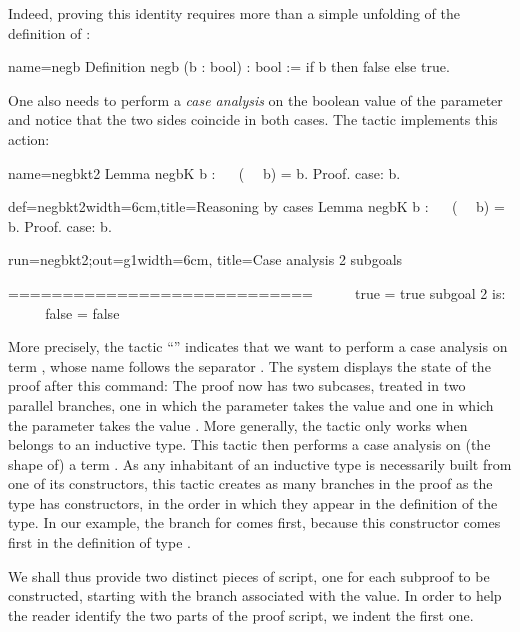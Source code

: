 Indeed, proving this identity requires more than a simple unfolding of
the definition of :

\begin{coq}{name=negb}{}
Definition negb (b : bool) : bool := if b then false else true.
\end{coq}
One also needs to perform a \emph{case analysis} on the boolean value
of the parameter  and notice that the two sides coincide in
both cases. The tactic  implements this action:

\begin{coqdef}{name=negbkt2}
Lemma negbK b : ~~ (~~ b) = b.
Proof.
case: b.
\end{coqdef}
\begin{coq-left}{def=negbkt2}{width=6cm,title=Reasoning by cases}
Lemma negbK b : ~~ (~~ b) = b.
Proof.
case: b.
$~$
$~$
$~$
\end{coq-left}
\begin{coqout-right}{run=negbkt2;out=g1}{width=6cm, title=Case analysis}
2 subgoals

  ============================
   ~~ ~~ true = true
subgoal 2 is:
 ~~ ~~ false = false
\end{coqout-right}

More precisely, the tactic ``'' indicates that we want to
perform a case analysis on term , whose
name follows the separator \C{:}. The \Coq{} system displays the state
of the proof after this command: The proof now has two subcases,
treated in two parallel branches, one in which the parameter 
takes the value  and one in which the parameter  takes
the value . More generally, the  tactic only works
when  belongs to an inductive type.  This tactic then
performs a
case analysis on (the shape of) a term .  As any inhabitant of an
inductive type is necessarily
built from one of its constructors, this tactic creates as many
branches in the proof as the type has constructors, in the order in
which they appear in the definition of the type. In our example, the
branch for  comes first, because this constructor comes first
in the definition of type .

We shall thus provide two distinct pieces of
script, one for each subproof to be constructed,
starting with the branch associated with the  value. In order
to help the reader identify the two parts of the proof script,
we indent the first one.

